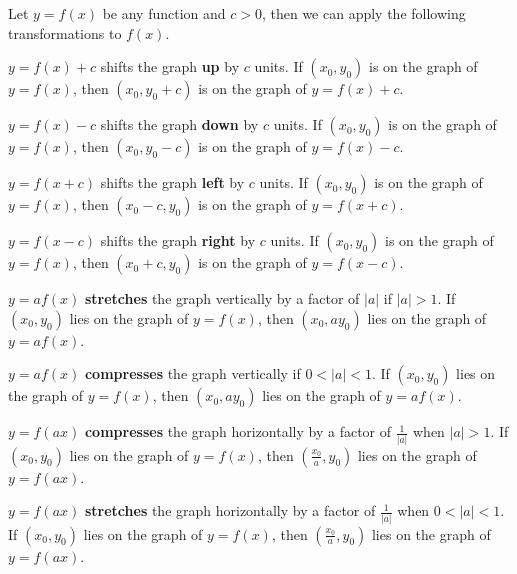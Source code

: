 \begin{dfn}
    Let \( y=f(x) \) be any function and \( c >0 \), then we can apply the following transformations to \( f(x) \).
\begin{description}[style=nextline]
 \item[Upward shift:] 
  \( y = f(x) + c \) shifts the graph \textbf{up} by \( c \) units.  
  If \( (x_0, y_0) \) is on the graph of \( y = f(x) \), then \( (x_0, y_0 + c) \) is on the graph of \( y = f(x) + c \).

  \item[Downward shift:] 
  \( y = f(x) - c \) shifts the graph \textbf{down} by \( c \) units.  
  If \( (x_0, y_0) \) is on the graph of \( y = f(x) \), then \( (x_0, y_0 - c) \) is on the graph of \( y = f(x) - c \).

  \item[Left shift:] 
  \( y = f(x + c) \) shifts the graph \textbf{left} by \( c \) units.  
  If \( (x_0, y_0) \) is on the graph of \( y = f(x) \), then \( (x_0 - c, y_0) \) is on the graph of \( y = f(x + c) \).

  \item[Right shift:] 
  \( y = f(x - c) \) shifts the graph \textbf{right} by \( c \) units.  
  If \( (x_0, y_0) \) is on the graph of \( y = f(x) \), then \( (x_0 + c, y_0) \) is on the graph of \( y = f(x - c) \).

    \item[Vertical stretch:] 
  \( y = a f(x) \) \textbf{stretches} the graph vertically by a factor of \( |a| \) if \( |a| > 1 \).  
  If \( (x_0, y_0) \) lies on the graph of \( y = f(x) \), then \( (x_0, a y_0) \) lies on the graph of \( y = a f(x) \).

  \item[Vertical compression:] 
  \( y = a f(x) \) \textbf{compresses} the graph vertically if \( 0 < |a| < 1 \).  
  If \( (x_0, y_0) \) lies on the graph of \( y = f(x) \), then \( (x_0, a y_0) \) lies on the graph of \( y = a f(x) \).

  \item[Horizontal compression:] 
  \( y = f(ax) \) \textbf{compresses} the graph horizontally by a factor of \( \frac{1}{|a|} \) when \( |a| > 1 \).  
  If \( (x_0, y_0) \) lies on the graph of \( y = f(x) \), then \( \left( \frac{x_0}{a}, y_0 \right) \) lies on the graph of \( y = f(ax) \).

  \item[Horizontal stretch:] 
  \( y = f(ax) \) \textbf{stretches} the graph horizontally by a factor of \( \frac{1}{|a|} \) when \( 0 < |a| < 1 \).  
  If \( (x_0, y_0) \) lies on the graph of \( y = f(x) \), then \( \left( \frac{x_0}{a}, y_0 \right) \) lies on the graph of \( y = f(ax) \).


\end{description}
\end{dfn}
